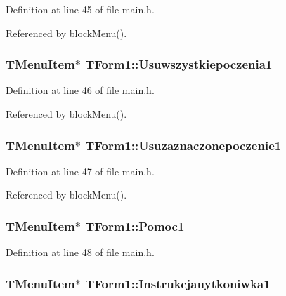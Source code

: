 Definition at line 45 of file main.h.

Referenced by blockMenu().\hypertarget{classTForm1_725cf7f5e578ee304efeeb97522e4812}{
\subsubsection[Usuwszystkiepoczenia1]{\setlength{\rightskip}{0pt plus 5cm}TMenuItem$\ast$ {\bf TForm1::Usuwszystkiepoczenia1}}}
\label{classTForm1_725cf7f5e578ee304efeeb97522e4812}




Definition at line 46 of file main.h.

Referenced by blockMenu().\hypertarget{classTForm1_3a1a0d7e4b61af79e2119fc8e171b267}{
\subsubsection[Usuzaznaczonepoczenie1]{\setlength{\rightskip}{0pt plus 5cm}TMenuItem$\ast$ {\bf TForm1::Usuzaznaczonepoczenie1}}}
\label{classTForm1_3a1a0d7e4b61af79e2119fc8e171b267}




Definition at line 47 of file main.h.

Referenced by blockMenu().\hypertarget{classTForm1_1be67d689b1e4751c5043657cde7fb7e}{
\subsubsection[Pomoc1]{\setlength{\rightskip}{0pt plus 5cm}TMenuItem$\ast$ {\bf TForm1::Pomoc1}}}
\label{classTForm1_1be67d689b1e4751c5043657cde7fb7e}




Definition at line 48 of file main.h.\hypertarget{classTForm1_015daea982a9bfc8c84724ed5db93435}{
\subsubsection[Instrukcjauytkoniwka1]{\setlength{\rightskip}{0pt plus 5cm}TMenuItem$\ast$ {\bf TForm1::Instrukcjauytkoniwka1}}}
\label{classTForm1_015daea982a9bfc8c84724ed5db93435}




